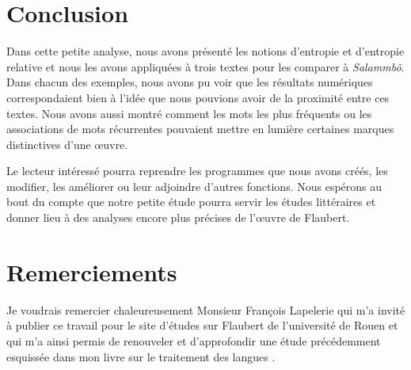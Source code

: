 \documentclass[]{article}
\begin{document}
%

\section{Conclusion}
Dans cette petite analyse, nous avons présenté les notions d'entropie et d'entropie relative et nous les avons appliquées à trois textes pour les comparer à \textit{Salammbô}. Dans chacun des exemples, nous avons pu voir que les résultats numériques correspondaient bien à l'idée que nous pouvions avoir de la proximité entre ces textes. Nous avons aussi montré comment les mots les plus fréquents ou les associations de mots récurrentes pouvaient mettre en lumière certaines marques distinctives d'une œuvre.

Le lecteur intéressé pourra reprendre les programmes que nous avons créés, les modifier, les améliorer ou leur adjoindre d'autres fonctions. Nous espérons au bout du compte que notre petite étude pourra servir les études littéraires et donner lieu à des analyses encore plus précises de l'œuvre de Flaubert. 

\section*{Remerciements}
Je voudrais remercier chaleureusement Monsieur François Lapelerie qui m'a invité à publier ce travail pour le site d'études sur Flaubert de l'université de Rouen et qui m'a ainsi permis de renouveler et d'approfondir une étude précédemment esquissée dans mon livre sur le traitement des langues \citep{nugues2006,nugues2014}.
\end{document}
